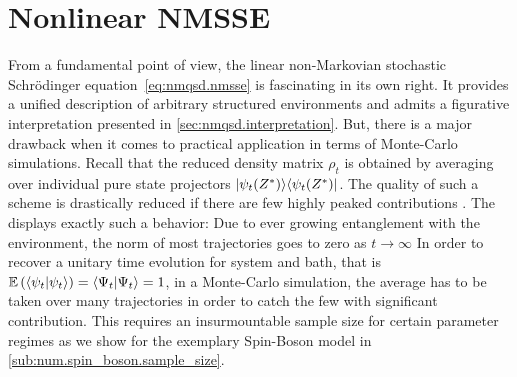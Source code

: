 \section{Nonlinear NMSSE}
\label{sec:nmqsd.nonlin_nmsse}
%

From a fundamental point of view, the linear non-Markovian stochastic Schrödinger equation~\ref{eq:nmqsd.nmsse} is fascinating in its own right.
It provides a unified description of arbitrary structured environments and admits a figurative interpretation presented in \autoref{sec:nmqsd.interpretation}.
But, there is a major drawback when it comes to practical application in terms of Monte-Carlo simulations.
Recall that the reduced density matrix $\rho_t$ is obtained by averaging over individual pure state projectors $\ket{\psitZ}\bra{\psitZ}$.
The quality of such a scheme is drastically reduced if there are few highly peaked contributions \cite{DuSh11_monte_carlo}.
The \NMSSE displays exactly such a behavior:
Due to ever growing entanglement with the environment, the norm of most trajectories goes to zero as $t \to \infty$
In order to recover a unitary time evolution for system and bath, that is $\E[\braket{\psi_t}{\psi_t}] = \braket{\Psi_t}{\Psi_t} = 1$, in a Monte-Carlo simulation, the average has to be taken over many trajectories in order to catch the few with significant contribution.
This requires an insurmountable sample size for certain parameter regimes as we show for the exemplary Spin-Boson model in \autoref{sub:num.spin_boson.sample_size}.

